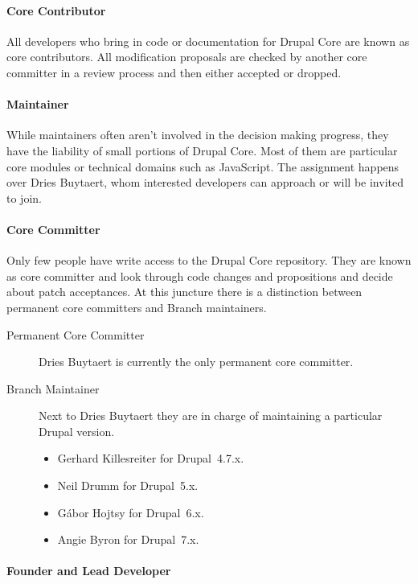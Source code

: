 \paragraph{Core Contributor}

All developers who bring in code or documentation for Drupal Core are known as
core contributors. All modification proposals are checked by another core
committer in a review process and then either accepted or dropped.

\paragraph{Maintainer}

While maintainers often aren't involved in the decision making progress, they
have the liability of small portions of Drupal Core. Most of them are
particular core modules or technical domains such as JavaScript. The assignment
happens over Dries Buytaert, whom interested developers can approach or will be
invited to join.

\paragraph{Core Committer}

Only few people have write access to the Drupal Core repository. They are known
as core committer and look through code changes and propositions and decide
about patch acceptances. At this juncture there is a distinction between
permanent core committers and Branch maintainers.

\begin{description}
  \item[Permanent Core Committer] Dries Buytaert is currently the only permanent core
    committer.
  \item[Branch Maintainer] Next to Dries Buytaert they are in charge of
  maintaining a particular Drupal version.
  \begin{itemize}
    \item Gerhard Killesreiter for Drupal~4.7.x.
    \item Neil Drumm for Drupal~5.x.
    \item Gábor Hojtsy for Drupal~6.x.
    \item Angie Byron for Drupal~7.x.
  \end{itemize}
\end{description}

\paragraph{Founder and Lead Developer}

